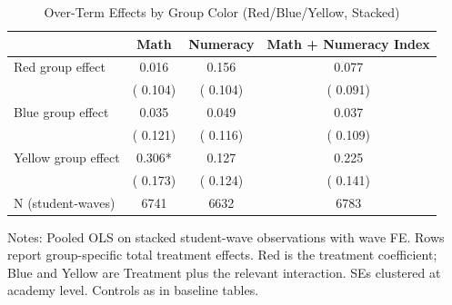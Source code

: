 \begin{table}[!htbp]
\centering
\caption{Over-Term Effects by Group Color (Red/Blue/Yellow, Stacked)}
\label{tab:ng_over_terms_interact}
\begin{threeparttable}
\begin{tabular}[t]{lccc}
\toprule
 & Math & Numeracy & Math + Numeracy Index \\
\midrule
Red group effect &   0.016 &   0.156 &   0.077 \\
 & (  0.104) & (  0.104) & (  0.091) \\
Blue group effect &   0.035 &   0.049 &   0.037 \\
 & (  0.121) & (  0.116) & (  0.109) \\
Yellow group effect &   0.306* &   0.127 &   0.225 \\
 & (  0.173) & (  0.124) & (  0.141) \\
\addlinespace
N (student-waves) & 6741 & 6632 & 6783 \\
\bottomrule
\end{tabular}
\begin{tablenotes}[para]
\item Notes: Pooled OLS on stacked student-wave observations with wave FE. Rows report group-specific total treatment effects. 
Red is the treatment coefficient; Blue and Yellow are Treatment plus the relevant interaction. SEs clustered at academy level. Controls as in baseline tables.
\end{tablenotes}
\end{threeparttable}
\end{table}
